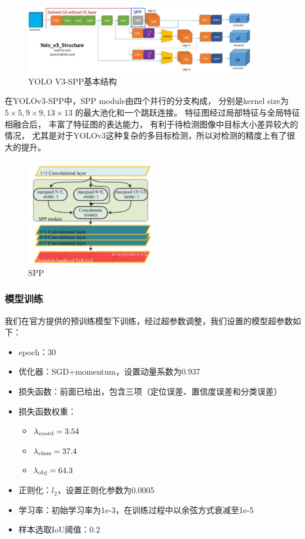 \documentclass[UTF8]{ctexart}
\begin{document}
\begin{figure}[h]
    \centering
    \includegraphics[width=0.9\textwidth]{../img/YOLOv3-SPP.png}
    \caption{YOLO V3-SPP基本结构}
\end{figure}

在YOLOv3-SPP中，SPP module由四个并行的分支构成，
分别是kernel size为 $5\times5, 9\times9, 13\times13$
的最大池化和一个跳跃连接。
特征图经过局部特征与全局特征相融合后，
丰富了特征图的表达能力，
有利于待检测图像中目标大小差异较大的情况，
尤其是对于YOLOv3这种复杂的多目标检测，所以对检测的精度上有了很大的提升。

\begin{figure}[h]
    \centering
    \includegraphics[width=0.5\textwidth]{../img/SPP.png}
    \caption{SPP}
\end{figure}

\subsubsection{模型训练}

我们在官方提供的预训练模型下训练，经过超参数调整，我们设置的模型超参数如下：

\begin{itemize}
    \item epoch：30
    \item 优化器：SGD+momentum，设置动量系数为0.937
    \item 损失函数：前面已给出，包含三项（定位误差、置信度误差和分类误差）
    \item 损失函数权重：
    \begin{itemize}
        \item $\lambda_{\rm coord}=3.54$
        \item $\lambda_{\rm class}=37.4$
        \item $\lambda_{\rm obj}=64.3$
    \end{itemize}
    \item 正则化：$l_2$，设置正则化参数为0.0005
    \item 学习率：初始学习率为1e-3，在训练过程中以余弦方式衰减至1e-5
    \item 样本选取IoU阈值：0.2
\end{itemize}
\end{document}
